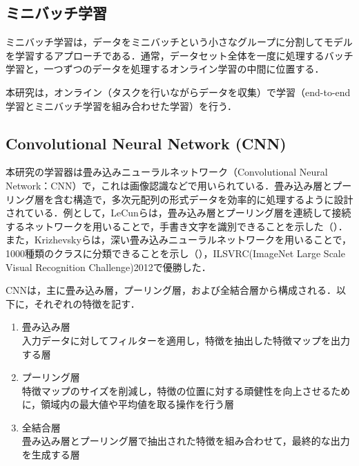   \vspace{1cm}

\subsection{ミニバッチ学習}

  ミニバッチ学習は，データをミニバッチという小さなグループに分割してモデルを学習するアプローチである．通常，データセット全体を一度に処理するバッチ学習と，一つずつのデータを処理するオンライン学習の中間に位置する．

  \vspace{2cm}

  本研究は，オンライン（タスクを行いながらデータを収集）で学習（end-to-end学習とミニバッチ学習を組み合わせた学習）を行う．

\newpage

\subsection{Convolutional Neural Network (CNN)}

  本研究の学習器は畳み込みニューラルネットワーク（Convolutional Neural Network：CNN）で，これは画像認識などで用いられている\cite{yann1}\cite{alex}．畳み込み層とプーリング層を含む構造で，多次元配列の形式データを効率的に処理するように設計されている．例として，LeCunら\cite{yann1}は，畳み込み層とプーリング層を連続して接続するネットワークを用いることで，手書き文字を識別できることを示した（）．また，Krizhevskyら\cite{alex}は，深い畳み込みニューラルネットワークを用いることで，1000種類のクラスに分類できることを示し（），ILSVRC(ImageNet Large Scale Visual Recognition Challenge)2012で優勝した．

  CNNは，主に畳み込み層，プーリング層，および全結合層から構成される．以下に，それぞれの特徴を記す．

  \begin{enumerate}
    \item 畳み込み層\\
    入力データに対してフィルターを適用し，特徴を抽出した特徴マップを出力する層
    \item プーリング層\\
    特徴マップのサイズを削減し，特徴の位置に対する頑健性を向上させるために，領域内の最大値や平均値を取る操作を行う層
    \item 全結合層\\
    畳み込み層とプーリング層で抽出された特徴を組み合わせて，最終的な出力を生成する層
  \end{enumerate}

